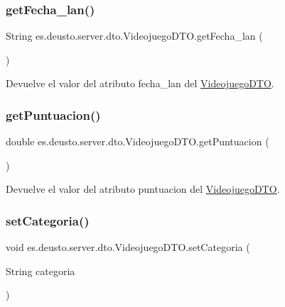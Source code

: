 \subsubsection{\texorpdfstring{getFecha\_lan()}{getFecha\_lan()}}
{\footnotesize\ttfamily String es.\+deusto.\+server.\+dto.\+Videojuego\+D\+T\+O.\+get\+Fecha\+\_\+lan (\begin{DoxyParamCaption}{ }\end{DoxyParamCaption})}

Devuelve el valor del atributo fecha\+\_\+lan del \mbox{\hyperlink{classes_1_1deusto_1_1server_1_1dto_1_1_videojuego_d_t_o}{Videojuego\+D\+TO}}. \mbox{\label{classes_1_1deusto_1_1server_1_1dto_1_1_videojuego_d_t_o_a4eeabdcb0cf43059f53c1689d38f374d}} 
\subsubsection{\texorpdfstring{getPuntuacion()}{getPuntuacion()}}
{\footnotesize\ttfamily double es.\+deusto.\+server.\+dto.\+Videojuego\+D\+T\+O.\+get\+Puntuacion (\begin{DoxyParamCaption}{ }\end{DoxyParamCaption})}

Devuelve el valor del atributo puntuacion del \mbox{\hyperlink{classes_1_1deusto_1_1server_1_1dto_1_1_videojuego_d_t_o}{Videojuego\+D\+TO}}. \mbox{\label{classes_1_1deusto_1_1server_1_1dto_1_1_videojuego_d_t_o_a696bd10262e4c4048d30d25b51ad4942}} 
\subsubsection{\texorpdfstring{setCategoria()}{setCategoria()}}
{\footnotesize\ttfamily void es.\+deusto.\+server.\+dto.\+Videojuego\+D\+T\+O.\+set\+Categoria (\begin{DoxyParamCaption}\item[{String}]{categoria }\end{DoxyParamCaption})}

